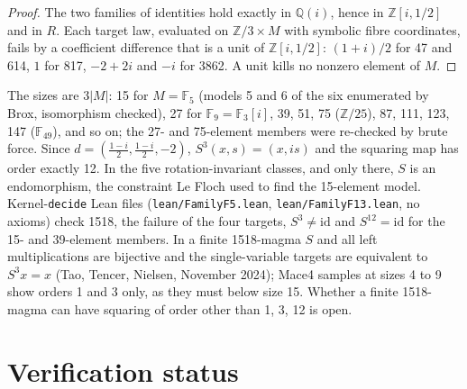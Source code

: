 \documentclass[11pt]{article}
\theoremstyle{remark}\newtheorem*{remark}{Remark}
\newcommand{\Z}{\mathbb{Z}}
\newcommand{\Q}{\mathbb{Q}}
\newcommand{\F}{\mathbb{F}}
\begin{document}
\begin{proof}
The two families of identities hold exactly in $\Q(i)$, hence in $\Z[i,1/2]$ and in $R$. Each target law, evaluated on $\Z/3\times M$ with symbolic fibre coordinates, fails by a coefficient difference that is a unit of $\Z[i,1/2]$: $(1+i)/2$ for 47 and 614, $1$ for 817, $-2+2i$ and $-i$ for 3862. A unit kills no nonzero element of $M$.
\end{proof}

The sizes are $3|M|$: 15 for $M=\F_5$ (models 5 and 6 of the six enumerated by Brox, isomorphism checked), 27 for $\F_9=\F_3[i]$, 39, 51, 75 ($\Z/25$), 87, 111, 123, 147 ($\F_{49}$), and so on; the 27- and 75-element members were re-checked by brute force. Since $d=(\tfrac{1-i}{2},\tfrac{1-i}{2},-2)$, $S^{3}(x,s)=(x,is)$ and the squaring map has order exactly 12. In the five rotation-invariant classes, and only there, $S$ is an endomorphism, the constraint Le Floch used to find the 15-element model. Kernel-\texttt{decide} Lean files (\texttt{lean/FamilyF5.lean}, \texttt{lean/FamilyF13.lean}, no axioms) check 1518, the failure of the four targets, $S^{3}\neq\mathrm{id}$ and $S^{12}=\mathrm{id}$ for the 15- and 39-element members. In a finite 1518-magma $S$ and all left multiplications are bijective and the single-variable targets are equivalent to $S^{3}x=x$ (Tao, Tencer, Nielsen, November 2024); Mace4 samples at sizes 4 to 9 show orders 1 and 3 only, as they must below size 15. Whether a finite 1518-magma can have squaring of order other than 1, 3, 12 is open.

\section{Verification status}\label{sec:verif}
\end{document}
